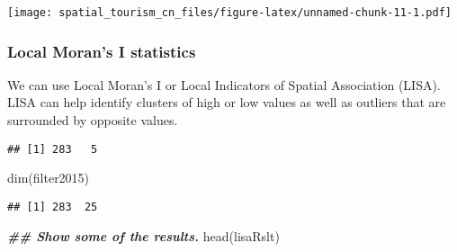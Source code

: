 \documentclass[
]{article}
\newenvironment{Shaded}{\begin{snugshade}}{\end{snugshade}}
\newcommand{\AttributeTok}[1]{\textcolor[rgb]{0.77,0.63,0.00}{#1}}
\newcommand{\CommentTok}[1]{\textcolor[rgb]{0.56,0.35,0.01}{\textit{#1}}}
\newcommand{\ConstantTok}[1]{\textcolor[rgb]{0.00,0.00,0.00}{#1}}
\newcommand{\DocumentationTok}[1]{\textcolor[rgb]{0.56,0.35,0.01}{\textbf{\textit{#1}}}}
\newcommand{\FunctionTok}[1]{\textcolor[rgb]{0.00,0.00,0.00}{#1}}
\newcommand{\NormalTok}[1]{#1}
\newcommand{\OtherTok}[1]{\textcolor[rgb]{0.56,0.35,0.01}{#1}}
\newcommand{\SpecialCharTok}[1]{\textcolor[rgb]{0.00,0.00,0.00}{#1}}
\begin{document}
\texttt{[image: spatial\_tourism\_cn\_files/figure-latex/unnamed-chunk-11-1.pdf]}

\hypertarget{local-morans-i-statistics}{%
\subsubsection{Local Moran's I
statistics}\label{local-morans-i-statistics}}

We can use Local Moran's I or Local Indicators of Spatial Association
(LISA). LISA can help identify clusters of high or low values as well as
outliers that are surrounded by opposite values.

\begin{Shaded}
\end{Shaded}

\begin{verbatim}
## [1] 283   5
\end{verbatim}

\begin{Shaded}
\begin{Highlighting}[]
\FunctionTok{dim}\NormalTok{(filter2015)}
\end{Highlighting}
\end{Shaded}

\begin{verbatim}
## [1] 283  25
\end{verbatim}

\begin{Shaded}
\begin{Highlighting}[]
\DocumentationTok{\#\# Show some of the results.}
\FunctionTok{head}\NormalTok{(lisaRslt)}
\end{Highlighting}
\end{Shaded}
\end{document}
